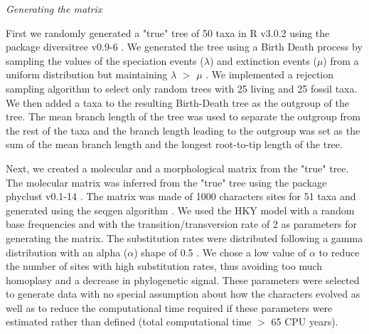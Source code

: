 \documentclass[12pt,letterpaper]{article}
\renewcommand{\subsection}[1]{%
\bigskip
\begin{center}
\begin{large}
\normalfont\itshape #1
\end{large}
\end{center}}
\begin{document}
\subsection{Generating the matrix}
First we randomly generated a "true" tree of 50 taxa in R v3.0.2 \citep{R302} using the package diversitree v0.9-6 \citep{fitzjohndiversitree2012}.
We generated the tree using a Birth Death process by sampling the values of the speciation events ($\lambda$) and extinction events ($\mu$) from a uniform distribution but maintaining $\lambda$ $>$ $\mu$ \citep{paradistime-dependent2011}.
We implemented a rejection sampling algorithm to select only random trees with 25 living and 25 fossil taxa. %
We then added a taxa to the resulting Birth-Death tree as the outgroup of the tree.
The mean branch length of the tree was used to separate the outgroup from the rest of the taxa and the branch length leading to the outgroup was set as the sum of the mean branch length and the longest root-to-tip length of the tree.

Next, we created a molecular and a morphological matrix from the "true" tree.
The molecular matrix was inferred from the "true" tree using the package phyclust v0.1-14 \citep{chen2011}.
The matrix was made of 1000 characters sites for 51 taxa and generated using the seqgen algorithm \citep{ranbaut1997seqgen}.
We used the HKY model \citep{HKY85} with a random base frequencies and with the transition/transversion rate of 2 \citep{douadycomparison2003} as parameters for generating the matrix.
The substitution rates were distributed following a gamma distribution with an alpha ($\alpha$) shape of 0.5 \citep{yangamong-site1996}.
We chose a low value of $\alpha$ to reduce the number of sites with high substitution rates, thus avoiding too much homoplasy and a decrease in phylogenetic signal.
These parameters were selected to generate data with no special assumption about how the characters evolved as well as to reduce the computational time required if these parameters were estimated rather than defined (total computational time $>$ 65 CPU years).
\end{document}
